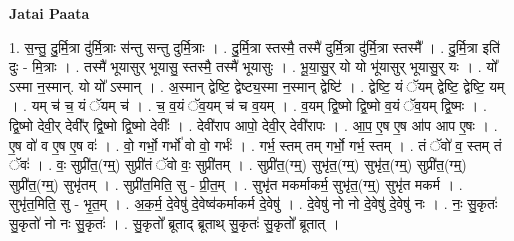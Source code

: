 \documentclass[17pt]{extarticle}
\begin{document}
\textbf{Jatai Paata} \newline

1. स॒न्तु॒ दु॒र्मि॒त्रा दु॑र्मि॒त्राः स॑न्तु सन्तु दुर्मि॒त्राः । . दु॒र्मि॒त्रा स्तस्मै॒ तस्मै॑ दुर्मि॒त्रा दु॑र्मि॒त्रा स्तस्मै᳚ । . दु॒र्मि॒त्रा इति॑ दुः - मि॒त्राः । . तस्मै॑ भूयासुर् भूयासु॒ स्तस्मै॒ तस्मै॑ भूयासुः । . भू॒या॒सु॒र् यो यो भू॑यासुर् भूयासु॒र् यः । . यो᳚ ऽस्मा न॒स्मान्. यो यो᳚ ऽस्मान् । . अ॒स्मान् द्वेष्टि॒ द्वेष्ट्य॒स्मा न॒स्मान् द्वेष्टि॑ । . द्वेष्टि॒ यं ॅयम् द्वेष्टि॒ द्वेष्टि॒ यम् । . यम् च॑ च॒ यं ॅयम् च॑ । . च॒ व॒यं ॅव॒यम् च॑ च व॒यम् । . व॒यम् द्वि॒ष्मो द्वि॒ष्मो व॒यं ॅव॒यम् द्वि॒ष्मः । . द्वि॒ष्मो देवी॒र् देवी᳚र् द्वि॒ष्मो द्वि॒ष्मो देवीः᳚ । . देवी॑राप आपो॒ देवी॒र् देवी॑रापः । . आ॒प॒ ए॒ष ए॒ष आ॑प आप ए॒षः । . ए॒ष वो॑ व ए॒ष ए॒ष वः॑ । . वो॒ गर्भो॒ गर्भो॑ वो वो॒ गर्भः॑ । . गर्भ॒ स्तम् तम् गर्भो॒ गर्भ॒ स्तम् । . तं ॅवो॑ व॒ स्तम् तं ॅवः॑ । . वः॒ सुप्री॑त॒(ग्म्॒) सुप्री॑तं ॅवो वः॒ सुप्री॑तम् । . सुप्री॑त॒(ग्म्॒) सुभृ॑त॒(ग्म्॒) सुभृ॑त॒(ग्म्॒) सुप्री॑त॒(ग्म्॒) सुप्री॑त॒(ग्म्॒) सुभृ॑तम् । . सुप्री॑त॒मिति॒ सु - प्री॒त॒म् । . सुभृ॑त मकर्माकर्म॒ सुभृ॑त॒(ग्म्॒) सुभृ॑त मकर्म । . सुभृ॑त॒मिति॒ सु - भृ॒त॒म् । . अ॒क॒र्म॒ दे॒वेषु॑ दे॒वेष्व॑कर्माकर्म दे॒वेषु॑ । . दे॒वेषु॑ नो नो दे॒वेषु॑ दे॒वेषु॑ नः । . नः॒ सु॒कृतः॑ सु॒कृतो॑ नो नः सु॒कृतः॑ । . सु॒कृतो᳚ ब्रूताद् ब्रूताथ् सु॒कृतः॑ सु॒कृतो᳚ ब्रूतात् । \newline
\end{document}
